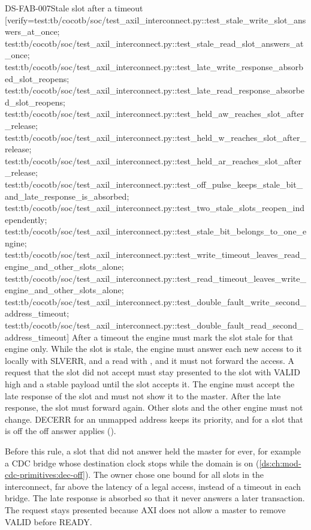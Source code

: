 \begin{requirement}{DS-FAB-007}{Stale slot after a timeout}
[verify={test:tb/cocotb/soc/test_axil_interconnect.py::test_stale_write_slot_answers_at_once; test:tb/cocotb/soc/test_axil_interconnect.py::test_stale_read_slot_answers_at_once; test:tb/cocotb/soc/test_axil_interconnect.py::test_late_write_response_absorbed_slot_reopens; test:tb/cocotb/soc/test_axil_interconnect.py::test_late_read_response_absorbed_slot_reopens; test:tb/cocotb/soc/test_axil_interconnect.py::test_held_aw_reaches_slot_after_release; test:tb/cocotb/soc/test_axil_interconnect.py::test_held_w_reaches_slot_after_release; test:tb/cocotb/soc/test_axil_interconnect.py::test_held_ar_reaches_slot_after_release; test:tb/cocotb/soc/test_axil_interconnect.py::test_off_pulse_keeps_stale_bit_and_late_response_is_absorbed; test:tb/cocotb/soc/test_axil_interconnect.py::test_two_stale_slots_reopen_independently; test:tb/cocotb/soc/test_axil_interconnect.py::test_stale_bit_belongs_to_one_engine; test:tb/cocotb/soc/test_axil_interconnect.py::test_write_timeout_leaves_read_engine_and_other_slots_alone; test:tb/cocotb/soc/test_axil_interconnect.py::test_read_timeout_leaves_write_engine_and_other_slots_alone; test:tb/cocotb/soc/test_axil_interconnect.py::test_double_fault_write_second_address_timeout; test:tb/cocotb/soc/test_axil_interconnect.py::test_double_fault_read_second_address_timeout}]
After a timeout the engine must mark the slot stale for that engine only. While the slot is stale, the engine must answer each new access to it locally with SLVERR, and a read with , and it must not forward the access. A request that the slot did not accept must stay presented to the slot with VALID high and a stable payload until the slot accepts it. The engine must accept the late response of the slot and must not show it to the master. After the late response, the slot must forward again. Other slots and the other engine must not change. DECERR for an unmapped address keeps its priority, and for a slot that is off the off answer applies ().
\end{requirement}
\begin{rationale}
Before this rule, a slot that did not answer held the master for ever, for example a CDC bridge whose destination clock stops while the domain is on (\cref{ds:ch:mod-cdc-primitives:dec-off}). The owner chose one bound for all slots in the interconnect, far above the latency of a legal access, instead of a timeout in each bridge. The late response is absorbed so that it never answers a later transaction. The request stays presented because AXI does not allow a master to remove VALID before READY.
\end{rationale}
